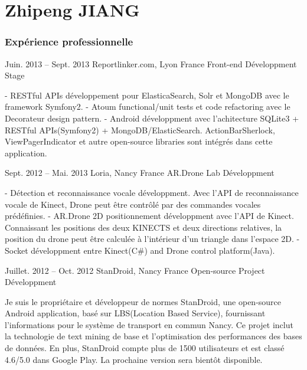 \documentclass{tccv}
\begin{document}
\part{Zhipeng JIANG}

\section{Expérience professionnelle}

\begin{eventlist}

\item{Juin. 2013 -- Sept. 2013}
     {Reportlinker.com, Lyon France}
     {Front-end Développment Stage}

- RESTful APIs développement pour ElasticaSearch, Solr et MongoDB avec le framework Symfony2. 
\newline
- Atoum functional/unit tests et code refactoring avec le Decorateur design pattern.
\newline
- Android développment avec l'achitecture SQLite3 + RESTful APIs(Symfony2) + MongoDB/ElasticSearch. ActionBarSherlock, ViewPagerIndicator et autre open-source libraries sont intégrés dans cette application.

\item{Sept. 2012 -- Mai. 2013}
     {Loria, Nancy France}
     {AR.Drone Lab Développment}

- Détection et reconnaissance vocale développment. Avec l'API de reconnaissance vocale de Kinect, Drone peut être contrôlé par des commandes vocales prédéfinies.
\newline
- AR.Drone 2D positionnement développment avec l'API de Kinect. Connaissant les positions des deux KINECTS et deux directions relatives, la position du drone peut être calculée à l'intérieur d'un triangle dans l'espace 2D.
\newline
- Socket développment entre Kinect(C\#) and Drone control platform(Java).


\item{Juillet. 2012 -- Oct. 2012}
     {StanDroid, Nancy France}
     {Open-source Project Développment}

Je suis le propriétaire et développeur de normes StanDroid, une open-source Android application, basé sur LBS(Location Based Service), fournissant l'informations pour le système de transport en commun Nancy. Ce projet inclut la technologie de text mining de base et l'optimisation des performances des bases de données. En plus, StanDroid compte plus de 1500 utilisateurs et est classé 4.6/5.0 dans Google Play. La prochaine version sera bientôt disponible.


\end{eventlist}
\end{document}
